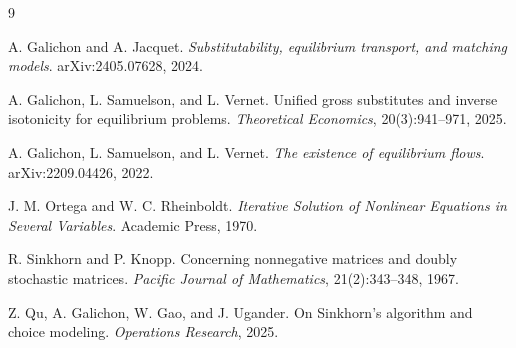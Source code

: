 \documentclass[11pt]{article}
\theoremstyle{definition}
\theoremstyle{plain}
\begin{document}
\begin{thebibliography}{9}

A. Galichon and A. Jacquet.
\newblock \emph{Substitutability, equilibrium transport, and matching models}.
\newblock arXiv:2405.07628, 2024.

A. Galichon, L. Samuelson, and L. Vernet.
\newblock Unified gross substitutes and inverse isotonicity for equilibrium problems.
\newblock \emph{Theoretical Economics}, 20(3):941--971, 2025.

A. Galichon, L. Samuelson, and L. Vernet.
\newblock \emph{The existence of equilibrium flows}.
\newblock arXiv:2209.04426, 2022.

J. M. Ortega and W. C. Rheinboldt.
\newblock \emph{Iterative Solution of Nonlinear Equations in Several Variables}.
\newblock Academic Press, 1970.

R. Sinkhorn and P. Knopp.
\newblock Concerning nonnegative matrices and doubly stochastic matrices.
\newblock \emph{Pacific Journal of Mathematics}, 21(2):343--348, 1967.

Z. Qu, A. Galichon, W. Gao, and J. Ugander.
\newblock On Sinkhorn's algorithm and choice modeling.
\newblock \emph{Operations Research}, 2025.

\end{thebibliography}
\end{document}
